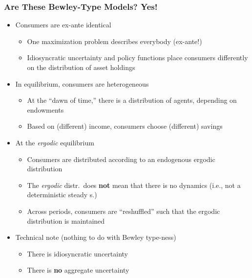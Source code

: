 \documentclass[10pt, aspectratio=1610, natbib, handout]{beamer}
\begin{document}
  \begin{frame}
    \frametitle{Are These Bewley-Type Models? Yes!}

    \begin{itemize}
      \item Consumers are ex-ante identical
        \begin{itemize}
          \item One maximization problem describes everybody (ex-ante!)
          \item Idiosyncratic uncertainty and policy functions place consumers differently on the distribution of asset holdings
        \end{itemize}

      \vfill\pause

      \item In equilibrium, consumers are heterogeneous
        \begin{itemize}
          \item At the ``dawn of time,'' there is a distribution of agents, depending on endowments
          \item Based on (different) income, consumers choose (different) savings
        \end{itemize}

      \vfill\pause

      \item At the \textit{ergodic} equilibrium
        \begin{itemize}
          \item Consumers are distributed according to an endogenous ergodic distribution
          \item The \textit{ergodic} distr.~does \textbf{not} mean that there is no dynamics (i.e., not a deterministic steady s.)
          \item Across periods, consumers are ``reshuffled'' such that the ergodic distribution is maintained
        \end{itemize}

      \vfill\pause

      \item Technical note (nothing to do with Bewley type-ness)
        \begin{itemize}
          \item There is idiosyncratic uncertainty
          \item There is \textbf{no} aggregate uncertainty
        \end{itemize}
    \end{itemize}

  \end{frame}
\end{document}
